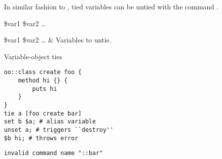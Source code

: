 \documentclass{article}
\renewcommand{\^}[1]{\textsuperscript{#1}}
\renewcommand{\_}[1]{\textsubscript{#1}}
\begin{document}
In similar fashion to , tied variables can be untied with the command .

\begin{syntax}
 \$var1 \$var2 …
\end{syntax}
\begin{args}
\$var1 \$var2 … & Variables to untie.
\end{args}

\begin{example}{Variable-object ties}
\begin{lstlisting}
oo::class create foo {
    method hi {} {
        puts hi
    }
}
tie a [foo create bar]
set b $a; # alias variable
unset a; # triggers ``destroy''
$b hi; # throws error
\end{lstlisting}
\tcblower
\begin{lstlisting}
invalid command name "::bar"
\end{lstlisting}
\end{example}
\end{document}
